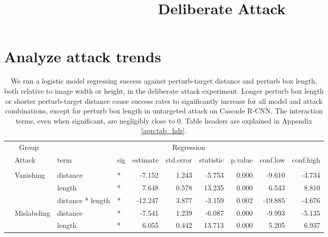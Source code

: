 \documentclass[
]{article}
\title{Deliberate Attack}
\author{}
\date{\vspace{-2.5em}}
\begin{document}
\maketitle

\section{Analyze attack trends}\label{analyze-attack-trends}

\begingroup\fontsize{9}{11}\selectfont

\begin{longtable}[t]{llllrrrrrr}
\caption{\label{tab:arbitrary_trend_table}We run a logistic model regressing success against perturb-target distance and perturb box length, both relative to image width or height, in the deliberate attack experiment. Longer perturb box length or shorter perturb-target distance cause success rates to significantly increase for all model and attack combinations, except for perturb box length in untargeted attack on Cascade R-CNN. The interaction terms, even when significant, are negligibly close to 0. Table headers are explained in Appendix \ref{app:tab_hdr}.}\\
\toprule
\multicolumn{2}{c}{Group} & \multicolumn{8}{c}{Regression} \\
\cmidrule(l{3pt}r{3pt}){1-2} \cmidrule(l{3pt}r{3pt}){3-10}
 & Attack & term & sig & estimate & std.error & statistic & p.value & conf.low & conf.high\\
\midrule
\addlinespace[0.3em]
\multicolumn{10}{l}{\textbf{YOLOv3}}\\
\hspace{1em} & Vanishing & distance & * & -7.152 & 1.243 & -5.753 & 0.000 & -9.610 & -4.734\\
\cmidrule{3-10}\nopagebreak
\hspace{1em} &  & length & * & 7.648 & 0.578 & 13.235 & 0.000 & 6.543 & 8.810\\
\cmidrule{3-10}\nopagebreak
\hspace{1em} &  & distance * length & * & -12.247 & 3.877 & -3.159 & 0.002 & -19.885 & -4.676\\
\cmidrule{2-10}\nopagebreak
\hspace{1em} & Mislabeling & distance & * & -7.541 & 1.239 & -6.087 & 0.000 & -9.993 & -5.135\\
\cmidrule{3-10}\nopagebreak
\hspace{1em} &  & length & * & 6.055 & 0.442 & 13.713 & 0.000 & 5.205 & 6.937\\

\end{longtable}
\end{document}
